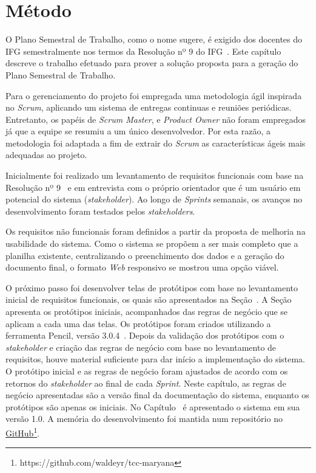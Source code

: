 \chapter{Método}
\label{Metodo}
\indent

O Plano Semestral de Trabalho, como o nome sugere, é exigido dos docentes do \ac{IFG} semestralmente nos termos da Resolução nº 9 do \ac{IFG}~\citep{resolucao}.
Este capítulo descreve o trabalho efetuado para prover a solução proposta para a geração do Plano Semestral de Trabalho.

Para o gerenciamento do projeto foi empregada uma metodologia ágil inspirada no \textit{Scrum}, aplicando um sistema de entregas continuas e reuniões periódicas. 
Entretanto, os papéis de \textit{Scrum Master}, e \textit{Product Owner} não foram empregados já que a equipe se resumiu a um único desenvolvedor.
Por esta razão, a metodologia foi adaptada a fim de extrair do \textit{Scrum} as características ágeis mais adequadas ao projeto.

Inicialmente foi realizado um levantamento de requisitos funcionais com base na Resolução nº 9~\citep{resolucao} e em entrevista com o próprio orientador que é um usuário em potencial do sistema (\textit{stakeholder}).
Ao longo de \textit{Sprints} semanais, os avanços no desenvolvimento foram testados pelos \textit{stakeholders}.

Os requisitos não funcionais foram definidos a partir da proposta de melhoria na usabilidade do sistema. 
Como o sistema se propõem a ser mais completo que a planilha existente, centralizando o preenchimento dos dados e a geração do documento final, o formato \textit{Web} responsivo se mostrou uma opção viável.

O próximo passo foi desenvolver telas de protótipos com base no levantamento inicial de requisitos funcionais, os quais são apresentados na Seção~.
A Seção~ apresenta os protótipos iniciais, acompanhados das regras de negócio que se aplicam a cada uma das telas. 
Os protótipos foram criados utilizando a ferramenta Pencil, versão 3.0.4~\cite{pencil}. 
Depois da validação dos protótipos com o \textit{stakeholder} e criação das regras de negócio com base no levantamento de requisitos, houve material suficiente para dar início a implementação do sistema.
O protótipo inicial e as regras de negócio foram ajustados de acordo com os retornos do \textit{stakeholder} ao final de cada \textit{Sprint}.
Neste capítulo, as regras de negócio apresentadas são a versão final da documentação do sistema, enquanto os protótipos são apenas os iniciais.
No Capítulo~ é apresentado o sistema em sua versão 1.0. 
A memória do desenvolvimento foi mantida num repositório no \href{https://github.com/waldeyr/tcc-maryana}{GitHub}\footnote{https://github.com/waldeyr/tcc-maryana}.

